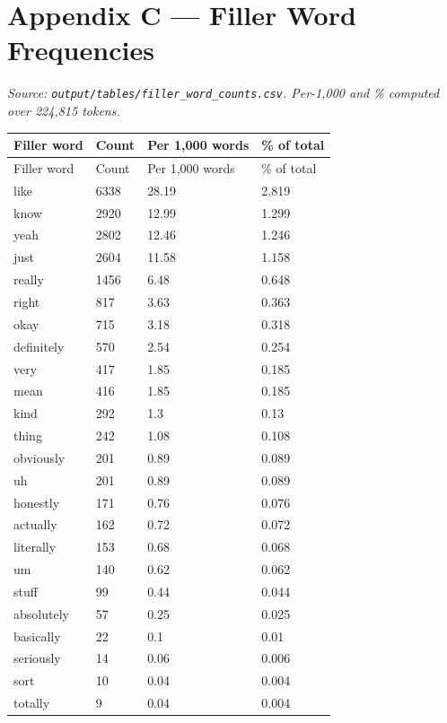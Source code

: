\documentclass[11pt]{article}
\begin{document}
\section*{Appendix C --- Filler Word Frequencies}

\emph{Source: \texttt{output/tables/filler\_word\_counts.csv}. Per-1,000 and \% computed over 224,815 tokens.}

\small\setlength{\tabcolsep}{4pt}

\begin{longtable}{llll}
\toprule
Filler word & Count & Per 1,000 words & \% of total \\
\midrule
\endfirsthead
\toprule
Filler word & Count & Per 1,000 words & \% of total \\
\midrule
\endhead
\bottomrule
\endlastfoot
like & 6338 & 28.19 & 2.819 \\
know & 2920 & 12.99 & 1.299 \\
yeah & 2802 & 12.46 & 1.246 \\
just & 2604 & 11.58 & 1.158 \\
really & 1456 & 6.48 & 0.648 \\
right & 817 & 3.63 & 0.363 \\
okay & 715 & 3.18 & 0.318 \\
definitely & 570 & 2.54 & 0.254 \\
very & 417 & 1.85 & 0.185 \\
mean & 416 & 1.85 & 0.185 \\
kind & 292 & 1.3 & 0.13 \\
thing & 242 & 1.08 & 0.108 \\
obviously & 201 & 0.89 & 0.089 \\
uh & 201 & 0.89 & 0.089 \\
honestly & 171 & 0.76 & 0.076 \\
actually & 162 & 0.72 & 0.072 \\
literally & 153 & 0.68 & 0.068 \\
um & 140 & 0.62 & 0.062 \\
stuff & 99 & 0.44 & 0.044 \\
absolutely & 57 & 0.25 & 0.025 \\
basically & 22 & 0.1 & 0.01 \\
seriously & 14 & 0.06 & 0.006 \\
sort & 10 & 0.04 & 0.004 \\
totally & 9 & 0.04 & 0.004 \\
\end{longtable}
\normalsize\setlength{\tabcolsep}{6pt}
\end{document}
